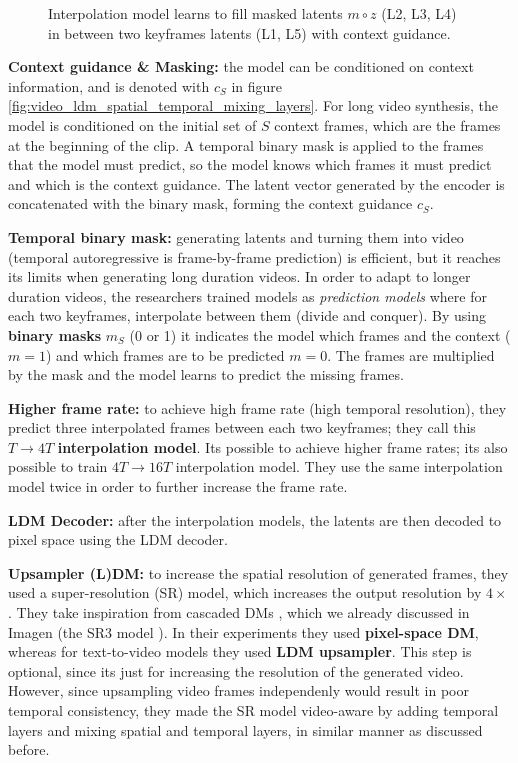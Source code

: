 \begin{figure}
    \centering
    \scalebox{0.5}{
        
    }
    \caption{Interpolation model learns to fill masked latents $m \circ z$ (L2, L3, L4) in between two keyframes latents (L1, L5) with context guidance.}
\end{figure}

\textbf{Context guidance \& Masking:} the model can be conditioned on context information, and is denoted with $c_S$ in figure \ref{fig:video_ldm_spatial_temporal_mixing_layers}. For long video synthesis, the model is conditioned on the initial set of $S$ context frames, which are the frames at the beginning of the clip. A temporal binary mask is applied to the frames that the model must predict, so the model knows which frames it must predict and which is the context guidance. The latent vector generated by the encoder is concatenated with the binary mask, forming the context guidance $c_S$.

\textbf{Temporal binary mask:} generating latents and turning them into video (temporal autoregressive is frame-by-frame prediction) is efficient, but it reaches its limits when generating long duration videos. In order to adapt to longer duration videos, the researchers trained models as \textit{prediction models} where for each two keyframes, interpolate between them (divide and conquer). By using \textbf{binary masks} $m_S$ (0 or 1) it indicates the model which frames and the context ($m = 1$) and which frames are to be predicted $m = 0$. The frames are multiplied by the mask and the model learns to predict the missing frames.

\textbf{Higher frame rate:} to achieve high frame rate (high temporal resolution), they predict three interpolated frames between each two keyframes; they call this $T \rightarrow 4T$ \textbf{interpolation model}. Its possible to achieve higher frame rates; its also possible to train $4T \rightarrow 16T$ interpolation model. They use the same interpolation model twice in order to further increase the frame rate.

\textbf{LDM Decoder: } after the interpolation models, the latents are then decoded to pixel space using the LDM decoder.

\textbf{Upsampler (L)DM: } to increase the spatial resolution of generated frames, they used a super-resolution (SR) model, which increases the output resolution by $4 \times $. They take inspiration from cascaded DMs \cite{cascaded_diffusion_models}, which we already discussed in Imagen (the SR3 model \cite{sr3}). In their experiments they used \textbf{pixel-space DM}, whereas for text-to-video models they used \textbf{LDM upsampler}. This step is optional, since its just for increasing the resolution of the generated video. However, since upsampling video frames independenly would result in poor temporal consistency, they made the SR model video-aware by adding temporal layers and mixing spatial and temporal layers, in similar manner as discussed before.


